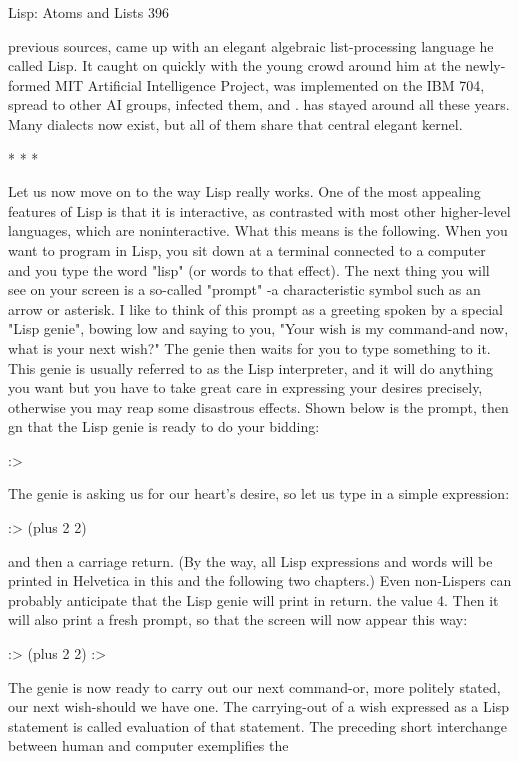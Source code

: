 Lisp: Atoms and Lists                                                               396

previous sources, came up with an elegant algebraic list-processing language he called
Lisp. It caught on quickly with the young crowd around him at the newly-formed MIT
Artificial Intelligence Project, was implemented on the IBM 704, spread to other AI
groups, infected them, and . has stayed around all these years. Many dialects now
exist, but all of them share that central elegant kernel.

                                     *       *      *

        Let us now move on to the way Lisp really works. One of the most appealing
features of Lisp is that it is interactive, as contrasted with most other higher-level
languages, which are noninteractive. What this means is the following. When you
want to program in Lisp, you sit down at a terminal connected to a computer and you
type the word "lisp" (or words to that effect). The next thing you will see on your
screen is a so-called "prompt" -a characteristic symbol such as an arrow or asterisk. I
like to think of this prompt as a greeting spoken by a special "Lisp genie", bowing
low and saying to you, "Your wish is my command-and now, what is your next
wish?" The genie then waits for you to type something to it. This genie is usually
referred to as the Lisp interpreter, and it will do anything you want but you have to
take great care in expressing your desires precisely, otherwise you may reap some
disastrous effects. Shown below is the prompt, then gn that the Lisp genie is ready to
do your bidding:

:>

The genie is asking us for our heart's desire, so let us type in a simple expression:

:> (plus 2 2)

and then a carriage return. (By the way, all Lisp expressions and words will be printed
in Helvetica in this and the following two chapters.) Even non-Lispers can probably
anticipate that the Lisp genie will print in return. the value 4. Then it will also print a
fresh prompt, so that the screen will now appear this way:

:> (plus 2 2)
:>

        The genie is now ready to carry out our next command-or, more politely
stated, our next wish-should we have one. The carrying-out of a wish expressed as a
Lisp statement is called evaluation of that statement. The preceding short interchange
between human and computer exemplifies the




